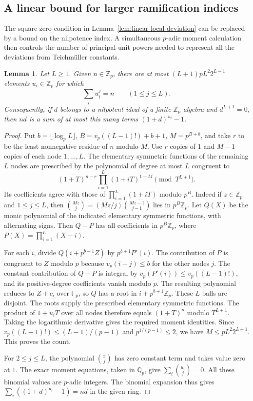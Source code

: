 \documentclass[11pt,letterpaper]{article}
\newtheorem{lemma}[lemma]{Lemma}
\theoremstyle{definition}
\numberwithin{equation}{section}
\begin{document}
\subsection{A linear bound for larger ramification indices}
\label{sec:local-near-linear}
The square-zero condition in Lemma~\ref{lem:linear-local-deviation}
can be replaced by a bound on the nilpotence index. A simultaneous
$p$-adic moment calculation then controls the number of principal-unit
powers needed to represent all the deviations from Teichm\"uller constants.

\begin{lemma}\label{lem:hmomentcompress}
Let $L\ge1$. Given $n\in\mathbb Z_p$, there are at most
$(L+1)pL^2 2^{L-1}$ elements $u_i\in\mathbb Z_p$ for which
\[
                  \sum_i u_i^j=n\qquad(1\le j\le L).
\]
Consequently, if $d$ belongs to a nilpotent ideal of a finite
$\mathbb Z_p$-algebra and $d^{L+1}=0$, then $nd$ is a sum of
at most this many terms $(1+d)^{u_i}-1$.
\end{lemma}
\begin{proof}
Put $b=\lfloor\log_p L\rfloor$,
$B=v_p((L-1)!)+b+1$, $M=p^{B+b}$, and take
$r$ to be the least nonnegative residue of $n$ modulo $M$.
Use $r$ copies of $1$ and $M-1$ copies of each node $1,\ldots,L$.
The elementary symmetric functions of the remaining $L$ nodes
are prescribed by the polynomial of degree at most $L$ congruent to
\[
         (1+T)^{n-r}\prod_{i=1}^L(1+iT)^{1-M}
                       \pmod{T^{L+1}} .
\]
Its coefficients agree with those of $\prod_{i=1}^L(1+iT)$ modulo
$p^B$. Indeed if $z\in\mathbb Z_p$ and $1\le j\le L$, then
$\binom{Mz}{j}=(Mz/j)\binom{Mz-1}{j-1}$ lies in $p^B\mathbb Z_p$.
Let $Q(X)$ be the monic polynomial of the indicated elementary
symmetric functions, with alternating signs. Then $Q-P$ has all
coefficients in $p^B\mathbb Z_p$, where
$P(X)=\prod_{i=1}^L(X-i)$.

For each $i$, divide $Q(i+p^{b+1}Z)$ by $p^{b+1}P'(i)$.
The contribution of $P$ is congruent to $Z$ modulo $p$ because
$v_p(i-j)\le b$ for the other nodes $j$. The constant contribution
of $Q-P$ is integral by
$v_p(P'(i))\le v_p((L-1)!)$, and its positive-degree coefficients
vanish modulo $p$. The resulting polynomial reduces to $Z+c_i$
over $\mathbb F_p$, so $Q$ has a root in $i+p^{b+1}\mathbb Z_p$.
These $L$ balls are disjoint. The roots supply the prescribed
elementary symmetric functions. The product of $1+u_iT$ over
all nodes therefore equals $(1+T)^n$ modulo $T^{L+1}$.
Taking the logarithmic derivative gives the required moment identities.
Since $v_p((L-1)!)\le(L-1)/(p-1)$ and $p^{1/(p-1)}\le2$,
we have $M\le pL^2 2^{L-1}$. This proves the count.

For $2\le j\le L$, the polynomial $\binom{x}{j}$ has zero
constant term and takes value zero at $1$. The exact moment equations,
taken in $\mathbb Q_p$, give $\sum_i\binom{u_i}{j}=0$.
All these binomial values are $p$-adic integers. The binomial expansion
thus gives $\sum_i((1+d)^{u_i}-1)=nd$ in the given ring.
\end{proof}
\end{document}
